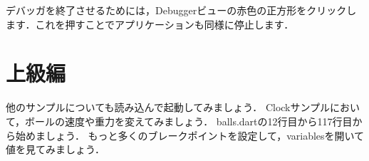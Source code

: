 
デバッガを終了させるためには，Debuggerビューの赤色の正方形をクリックします．これを押すことでアプリケーションも同様に停止します．


\section{上級編}

他のサンプルについても読み込んで起動してみましょう．
Clockサンプルにおいて，ボールの速度や重力を変えてみましょう．
balls.dartの12行目から117行目から始めましょう．
もっと多くのブレークポイントを設定して，variablesを開いて値を見てみましょう．


\clearpage
